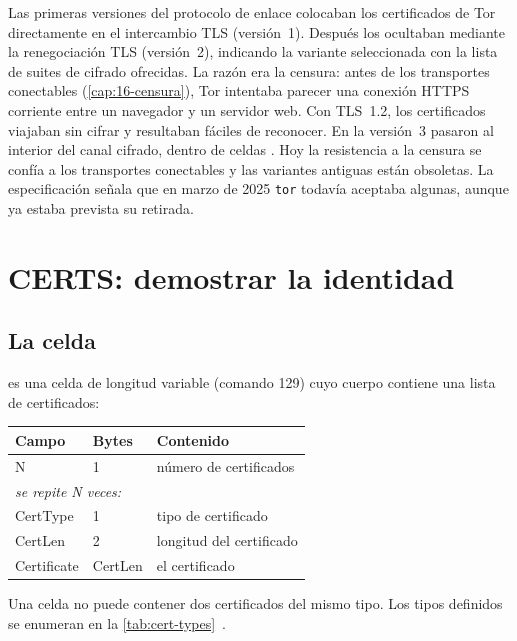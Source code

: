 \begin{storia}
Las primeras versiones del protocolo de enlace colocaban los certificados de Tor directamente en el intercambio TLS (versión~1). Después los ocultaban mediante la renegociación TLS (versión~2), indicando la variante seleccionada con la lista de suites de cifrado ofrecidas. La razón era la censura: antes de los transportes conectables (\cref{cap:16-censura}), Tor intentaba parecer una conexión HTTPS corriente entre un navegador y un servidor web. Con TLS~1.2, los certificados viajaban sin cifrar y resultaban fáciles de reconocer. En la versión~3 pasaron al interior del canal cifrado, dentro de celdas . Hoy la resistencia a la censura se confía a los transportes conectables y las variantes antiguas están obsoletas. La especificación señala que en marzo de 2025 \texttt{tor} todavía aceptaba algunas, aunque ya estaba prevista su retirada.
\end{storia}

\section{CERTS: demostrar la identidad}\label{sec:canale-certs}

\subsection{La celda}

 es una celda de longitud variable (comando 129) cuyo cuerpo contiene una lista de certificados:

\begin{center}
\begin{tabular}{lll}
\toprule
Campo & Bytes & Contenido \\
\midrule
N & 1 & número de certificados \\
\multicolumn{3}{l}{\emph{se repite N veces:}} \\
\quad CertType & 1 & tipo de certificado \\
\quad CertLen & 2 & longitud del certificado \\
\quad Certificate & CertLen & el certificado \\
\bottomrule
\end{tabular}
\end{center}

Una celda  no puede contener dos certificados del mismo tipo. Los tipos definidos se enumeran en la \cref{tab:cert-types}~.

